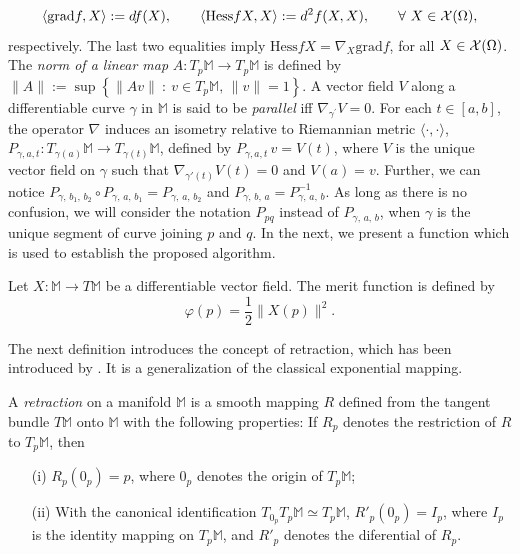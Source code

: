 \begin{equation}\nonumber
\langle \mbox{grad} f,X\rangle:=d f(X),  \qquad    \langle \mbox{Hess} f X,X\rangle :=d^2 f(X, X),  \qquad \forall~ X \in {\cal X}(\Omega),
\end{equation}
respectively. The last two equalities imply  $\mbox{Hess} f X= \nabla_{X}  \mbox{grad} f$,   for all  $X \in {\cal X}(\Omega)$.
The {\it norm of a  linear map} $A:T_p \mathbb{M} \to T_p \mathbb{M}$  is defined by $\|A\|:=\sup \left\{ \|Av \|~:~ v\in T_p \mathbb{M}, \,\|v\|=1 \right\}$.  A vector field $V$ along a differentiable curve $\gamma$ in $\mathbb{M}$ is said to be {\it parallel} iff $\nabla_{\gamma^{\prime}} V=0$.  For each $t \in [a,b]$, the operator $\nabla$ induces an isometry relative to Riemannian metric $ \langle \cdot , \cdot \rangle  $, $P_{\gamma,a,t} \colon T _{\gamma(a)} {\mathbb{M}} \to T _{\gamma(t)} {\mathbb{M}}$, defined by $ P_{\gamma,a,t}\, v = V(t)$, where $V$ is the unique vector field on $\gamma$ such that
$\nabla_{\gamma'(t)}V(t) = 0$ and $V(a)=v$. Further, we can notice $ P_{\gamma,\,b_{1},\,b_{2}}\circ P_{\gamma,\,a,\,b_{1}}=P_{\gamma,\,a,\,b_{2}}$ and  $P_{\gamma,\,b,\,a}=P^{-1}_{\gamma,\,a,\,b}$. As long as there is no confusion, we will  consider the notation $P_{pq}$  instead of $P_{\gamma,\,a,\,b}$, when $\gamma$ is the unique segment of curve joining  $p$ and $q$. In the next, we present a function which is used to establish the proposed algorithm.

\begin{definition}\label{eq:MeritFunction}
Let $X:\mathbb{M}\to T\mathbb{M}$ be a differentiable vector field. The merit function is defined by
\begin{equation}\label{Eq:meritfanction}
\varphi(p)=\dfrac{1}{2}\|X(p)\|^{2}.
\end{equation}
\end{definition}
\noindent The next definition introduces the concept of retraction, which has been introduced by \cite{Manton2002}. It is a generalization of the classical exponential mapping.
\begin{definition}\label{Df:nqc}
A \textit{retraction} on a manifold $\mathbb{M}$ is a smooth mapping $R$ defined from the tangent bundle $T\mathbb{M}$ onto $\mathbb{M}$ with the following properties: If $R_{p}$ denotes the restriction of $R$ to $T_{p}\mathbb{M}$, then
\begin{itemize}
\item[(i)] $R_{p}(0_{p})=p$, where $0_{p}$ denotes the origin of $T_{p}\mathbb{M}$;
\item[(ii)] With the canonical identification $T_{0_{p}}T_{p}\mathbb{M}\simeq T_{p}\mathbb{M}$, $R'_{p}(0_{p})=I_{p}$, where $I_{p}$ is the identity mapping on $T_{p}\mathbb{M}$, and $R'_{p}$ denotes the diferential of $R_{p}$.
\end{itemize}
\end{definition}

